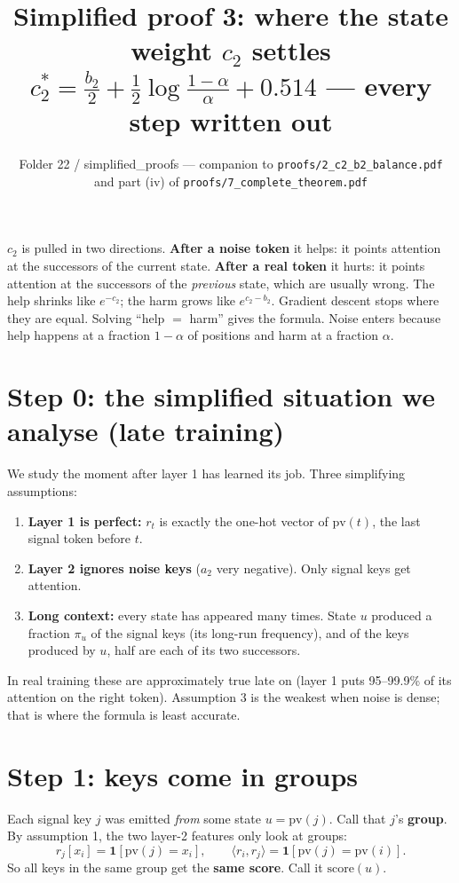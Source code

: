 \documentclass[11pt]{article}
\title{Simplified proof 3: where the state weight $c_2$ settles\\[4pt]
\large $c_2^\ast=\tfrac{b_2}{2}+\tfrac12\log\tfrac{1-\alpha}{\alpha}+0.514$ --- every step written out}
\author{Folder 22 / simplified\_proofs --- companion to \texttt{proofs/2\_c2\_b2\_balance.pdf} and part (iv) of \texttt{proofs/7\_complete\_theorem.pdf}}
\date{}
\newcommand{\1}{\mathbf{1}}
\begin{document}
\maketitle

\begin{idea}
$c_2$ is pulled in two directions. \textbf{After a noise token} it helps: it points attention at the
successors of the current state. \textbf{After a real token} it hurts: it points attention at the
successors of the \emph{previous} state, which are usually wrong. The help shrinks like $e^{-c_2}$; the harm
grows like $e^{c_2-b_2}$. Gradient descent stops where they are equal. Solving ``help $=$ harm'' gives the
formula. Noise enters because help happens at a fraction $1-\alpha$ of positions and harm at a fraction $\alpha$.
\end{idea}

\section{Step 0: the simplified situation we analyse (late training)}
We study the moment after layer 1 has learned its job. Three simplifying assumptions:
\begin{enumerate}
\item \textbf{Layer 1 is perfect:} $r_t$ is exactly the one-hot vector of $\mathrm{pv}(t)$, the last signal token
before $t$.
\item \textbf{Layer 2 ignores noise keys} ($a_2$ very negative). Only signal keys get attention.
\item \textbf{Long context:} every state has appeared many times. State $u$ produced a fraction $\pi_u$ of
the signal keys (its long-run frequency), and of the keys produced by $u$, half are each of its two
successors.
\end{enumerate}
In real training these are approximately true late on (layer 1 puts 95--99.9\% of its attention on the
right token). Assumption 3 is the weakest when noise is dense; that is where the formula is least accurate.

\section{Step 1: keys come in groups}
Each signal key $j$ was emitted \emph{from} some state $u=\mathrm{pv}(j)$. Call that $j$'s \textbf{group}. By
assumption 1, the two layer-2 features only look at groups:
\[
r_j[x_i]=\1[\mathrm{pv}(j)=x_i],\qquad \langle r_i,r_j\rangle=\1[\mathrm{pv}(j)=\mathrm{pv}(i)] .
\]
So all keys in the same group get the \textbf{same score}. Call it $\mathrm{score}(u)$.
\end{document}
